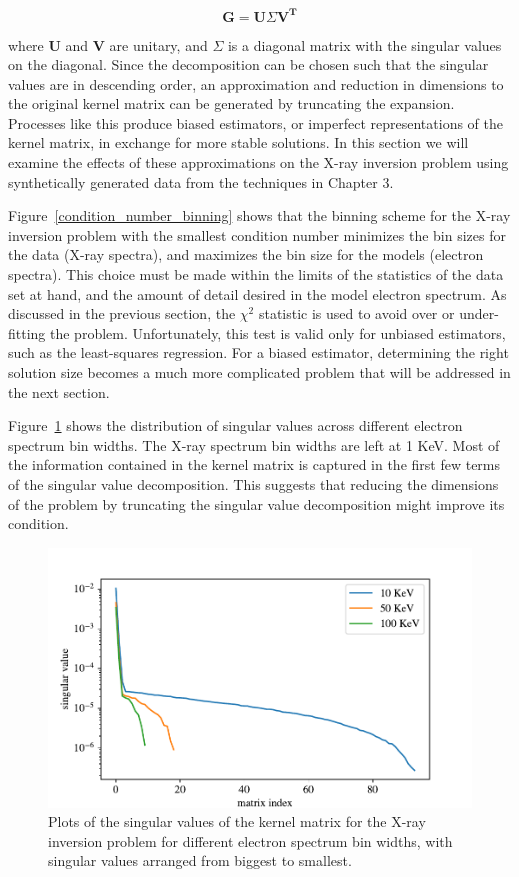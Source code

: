 $$\mathbf{G} = \mathbf{U}\Sigma\mathbf{V^T}$$

where $\mathbf{U}$ and $\mathbf{V}$ are unitary, and $\Sigma$ is a diagonal matrix with the singular values on the diagonal. Since the decomposition can be chosen such that the singular values are in descending order, an approximation and reduction in dimensions to the original kernel matrix can be generated by truncating the expansion. Processes like this produce biased estimators, or imperfect representations of the kernel matrix, in exchange for more stable solutions. In this section we will examine the effects of these approximations on the X-ray inversion problem using synthetically generated data from the techniques in Chapter 3. 

Figure~\ref{condition_number_binning} shows that the binning scheme for the X-ray inversion problem with the smallest condition number minimizes the bin sizes for the data (X-ray spectra), and maximizes the bin size for the models (electron spectra). This choice must be made within the limits of the statistics of the data set at hand, and the amount of detail desired in the model electron spectrum. As discussed in the previous section, the $\chi^2$ statistic is used to avoid over or under-fitting the problem. Unfortunately, this test is valid only for unbiased estimators, such as the least-squares regression. For a biased estimator, determining the right solution size becomes a much more complicated problem that will be addressed in the next section.

Figure~\ref{singular-value-plots} shows the distribution of singular values across different electron spectrum bin widths. The X-ray spectrum bin widths are left at 1 KeV. Most of the information contained in the kernel matrix is captured in the first few terms of the singular value decomposition. This suggests that reducing the dimensions of the problem by truncating the singular value decomposition might improve its condition.

\begin{figure}[p]
    \centering
    \includegraphics[width=\textwidth]{figures/chapter_4/singular_value_plots/fig_6.pdf}
    \caption{Plots of the singular values of the kernel matrix for the X-ray inversion problem for different electron spectrum bin widths, with singular values arranged from biggest to smallest.}
    \label{singular-value-plots}
\end{figure}

